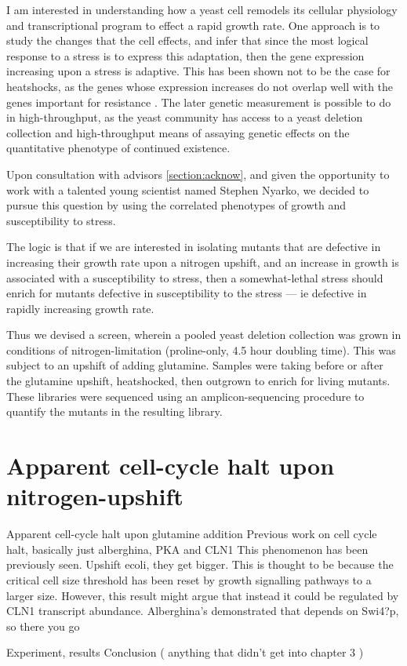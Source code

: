 I am interested in understanding how a yeast cell remodels its
cellular physiology and transcriptional program to effect a rapid
growth rate. 
One approach is to study the changes that the cell effects, and infer
that since the most logical response to a stress is to express this
adaptation, then the gene expression increasing upon a stress is
adaptive. This has been shown not to be the case for heatshocks, as
the genes whose expression increases do not overlap well with the
genes important for resistance \parencite{lee li botstein}.
The later genetic measurement is possible to do in high-throughput, as
the yeast community has access to a yeast deletion collection and
high-throughput means of assaying genetic effects on the quantitative
phenotype of continued existence. 

Upon consultation with advisors \autoref{section:acknow}, and given
the opportunity to work with a talented young scientist named Stephen
Nyarko, we decided to pursue this question by using the correlated
phenotypes of growth and susceptibility to stress.

The logic is that if we are interested in isolating mutants that are
defective in increasing their growth rate upon a nitrogen upshift, and
an increase in growth is associated with a susceptibility to stress,
then a somewhat-lethal stress should enrich for mutants defective in
susceptibility to the stress --- ie defective in rapidly increasing 
growth rate.

Thus we devised a screen, wherein a pooled yeast deletion collection
was grown in conditions of nitrogen-limitation (proline-only, 4.5 hour
doubling time). This was subject to an upshift of adding glutamine.
Samples were taking before or after the glutamine upshift,
heatshocked, then outgrown to enrich for living mutants.
These libraries were sequenced using an amplicon-sequencing procedure
to quantify the mutants in the resulting library.



\section{Apparent cell-cycle halt upon nitrogen-upshift}

Apparent cell-cycle halt upon
glutamine addition Previous work on cell cycle halt, basically just
alberghina, PKA and CLN1 This phenomenon has been previously seen.
Upshift ecoli, they get bigger.  This is thought to be because the
critical cell size threshold has been reset by growth signalling
pathways to a larger size. However, this result might argue that
instead it could be regulated by CLN1 transcript abundance.
Alberghina’s demonstrated that depends on Swi4?p, so there you go


Experiment, results Conclusion ( anything that didn’t get into chapter
3 )

